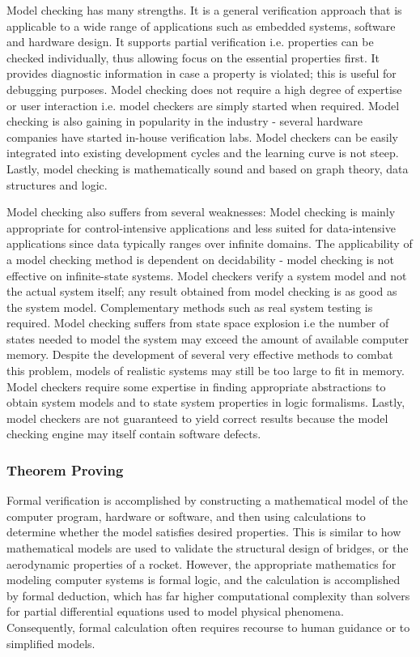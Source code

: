 Model checking has many strengths. It is a general verification approach that is applicable to a wide range of applications such as embedded systems, software and hardware design. It supports partial verification i.e. properties can be checked individually, thus allowing focus on the essential properties first. It provides diagnostic information in case a property is violated; this is useful for debugging purposes. Model checking does not require a high degree of expertise or user interaction i.e. model checkers are simply started when required. Model checking is also gaining in popularity in the industry - several hardware companies have started in-house verification labs. Model checkers can be easily integrated into existing development cycles and the learning curve is not steep. Lastly, model checking is mathematically sound and based on graph theory, data structures and logic. 

Model checking also suffers from several weaknesses: Model checking is mainly appropriate for control-intensive applications and less suited for data-intensive applications since data typically ranges over infinite domains. The applicability of a model checking method is dependent on decidability - model checking is not effective on infinite-state systems. Model checkers verify a system model and not the actual system itself; any result obtained from model checking is as good as the system model. Complementary methods such as real system testing is required. Model checking suffers from state space explosion i.e the number of states needed to model the system may exceed the amount of available computer memory. Despite the development of several very effective methods to combat this problem, models of realistic systems may still be too large to fit in memory. Model checkers require some expertise in finding appropriate abstractions to obtain system models and to state system properties in logic formalisms. Lastly, model checkers are not guaranteed to yield correct results because the model checking engine may itself contain software defects. 

\subsubsection{Theorem Proving}

Formal verification is accomplished by constructing a mathematical model of the computer program, hardware or software, and then using calculations to determine whether the model satisfies desired properties. This is similar to how mathematical models are used to validate the structural design of bridges, or the aerodynamic properties of a rocket. However, the appropriate mathematics for modeling computer systems is formal logic, and the calculation is accomplished by formal deduction, which has far higher computational complexity than solvers for partial differential equations used to model physical phenomena. Consequently, formal calculation often requires recourse to human guidance or to simplified models.

